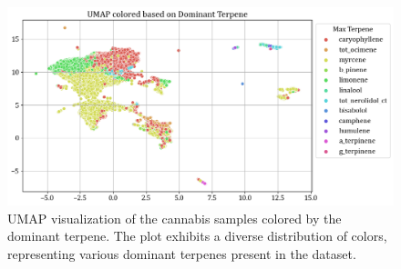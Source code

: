 \documentclass[11pt,a4paper]{article}
\begin{document}
\begin{figure}[H]
	\centering
	\includegraphics[scale=0.45]{images/umap_terpene.png}
	\caption{UMAP visualization of the cannabis samples colored by the dominant terpene. The plot exhibits a diverse distribution of colors, representing various dominant terpenes present in the dataset.}
	\label{fig:umap_terpene}
\end{figure}
\end{document}
